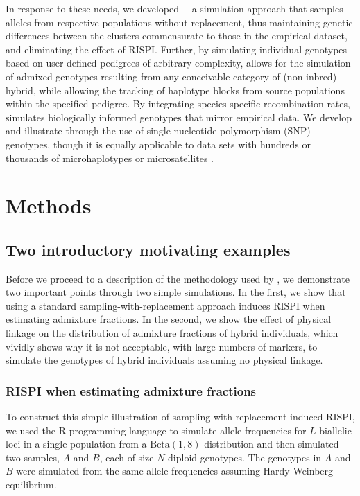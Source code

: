 In response to these needs, we developed \gscramble{}---a simulation approach that samples alleles from respective populations without
replacement, thus maintaining genetic differences between the clusters commensurate to those in the empirical dataset, and eliminating the effect of RISPI.
Further, by simulating individual genotypes based on user-defined pedigrees of arbitrary complexity, \gscramble{} allows for the simulation of admixed genotypes resulting from any conceivable category of (non-inbred) hybrid, while allowing the tracking of haplotype blocks from source populations within the specified pedigree.
By integrating species-specific recombination rates, \gscramble{} simulates biologically informed genotypes that mirror empirical data.
We develop and illustrate \gscramble{} through the use of single nucleotide polymorphism (SNP) genotypes, though it is equally applicable to data sets with hundreds or thousands of
microhaplotypes \citep{baetscher2018microhaplotypes} or microsatellites
\citep{zhan2017megasat}.




\section*{Methods}

\subsection*{Two introductory motivating examples}


Before we proceed to a description of the methodology used by \gscramble{},
we demonstrate two important points through two simple simulations.  In the first,
we show that using a standard sampling-with-replacement
approach induces RISPI when estimating admixture fractions. In the second, we show
the effect of physical linkage on the distribution of admixture fractions of hybrid individuals,
which vividly shows why it is not acceptable, with large numbers of markers, to simulate
the genotypes of hybrid individuals assuming no physical linkage.


\subsubsection*{RISPI when estimating admixture fractions}
\label{sec:rispi-sim}

To construct this simple illustration of sampling-with-replacement induced RISPI, 
we used the R programming language \citep{Rcoreteam} to
simulate allele frequencies for $L$ biallelic
loci in a single population from a $\mathrm{Beta}(1, 8)$ distribution and then simulated
two samples, $A$ and $B$, each of size $N$ diploid genotypes. The genotypes in $A$ and $B$ were simulated
from the same allele frequencies assuming Hardy-Weinberg equilibrium.

